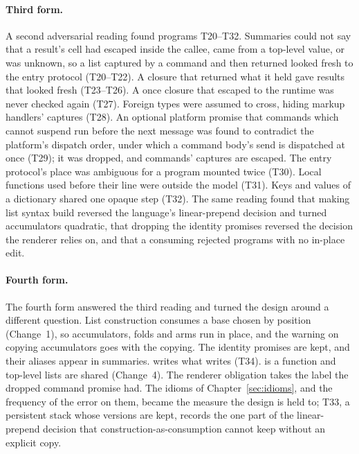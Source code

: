 \paragraph{Third form.} A second adversarial reading found programs T20--T32. Summaries could not say
that a result's cell had escaped inside the callee, came from a top-level value, or was unknown, so a list
captured by a command and then returned looked fresh to the entry protocol (T20--T22). A closure that
returned what it held gave results that looked fresh (T23--T26). A once closure that escaped to the
runtime was never checked again (T27). Foreign types were assumed to cross, hiding markup handlers'
captures (T28). An optional platform promise that commands which cannot suspend run before the next
message was found to contradict the platform's dispatch order, under which a command body's send is
dispatched at once (T29); it was dropped, and commands' captures are escaped. The entry protocol's place
was ambiguous for a program mounted twice (T30). Local functions used before their line were outside the
model (T31). Keys and values of a dictionary shared one opaque step (T32). The same reading found that
making list syntax build reversed the language's linear-prepend decision and turned accumulators
quadratic, that dropping the identity promises reversed the decision the renderer relies on, and that a
consuming  rejected programs with no in-place edit.

\paragraph{Fourth form.} The fourth form answered the third reading and turned the design around a
different question. List construction consumes a base chosen by position (Change~1), so accumulators,
folds and  arms run in place, and the warning on copying accumulators goes with the copying.
The identity promises are kept, and their aliases appear in summaries.  writes what
 writes (T34).  is a function and top-level lists are shared (Change~4). The
renderer obligation  takes the label the dropped command promise had. The idioms of
Chapter~\ref{sec:idioms}, and the frequency of the error on them, became the measure the design is held
to; T33, a persistent stack whose versions are kept, records the one part of the linear-prepend decision
that construction-as-consumption cannot keep without an explicit copy.

